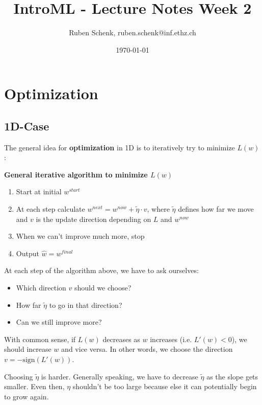 \documentclass[a4paper]{extarticle}
\title{IntroML - Lecture Notes Week 2}
\author{Ruben Schenk, ruben.schenk@inf.ethz.ch}
\date{\today}
\begin{document}
\maketitle
\newpage

\section{Optimization}

\subsection{1D-Case}

The general idea for \textbf{optimization} in 1D is to iteratively try to minimize \(L(w)\):

\begin{cbox}
    \textbf{General iterative algorithm to minimize \(L(w)\)}

    \begin{enumerate}
        \item Start at initial \(w^{start}\)
        \item At each step calculate \(w^{next} = w^{now} + \tilde{\eta} \cdot v\), where \(\tilde{\eta}\) defines how far we move and \(v\) is the update direction depending on \(L\) and \(w^{now}\)
        \item When we can't improve much more, stop
        \item Output \(\hat{w} = w^{final}\)
    \end{enumerate}
\end{cbox}

At each step of the algorithm above, we have to ask ourselves:

\begin{itemize}
    \item Which direction \(v\) should we choose?
    \item How far \(\tilde{\eta}\) to go in that direction?
    \item Can we still improve more?
\end{itemize}

With common sense, if \(L(w)\) decreases as \(w\) increases (i.e. \(L'(w) < 0\)), we should increase \(w\) and vice versa. In other words, we choose the direction \(v = - \text{sign}(L'(w))\).

Choosing \(\tilde{\eta}\) is harder. Generally speaking, we have to decrease \(\tilde{\eta}\) as the slope gets smaller. Even then, \(\eta\) shouldn't be too large because else it can potentially begin to grow again.
\end{document}
